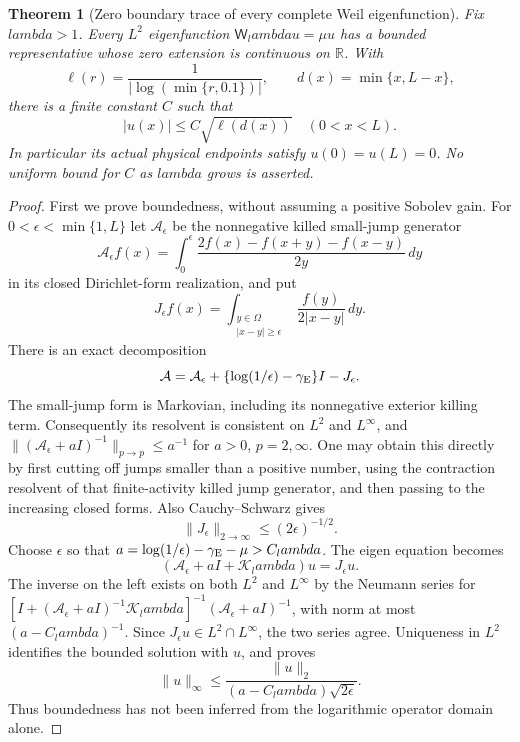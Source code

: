 \documentclass[11pt]{article}
\def\lambda{lambda}%
\newtheorem{theorem}{Theorem}[section]
\theoremstyle{remark}
\begin{document}
\begin{theorem}[Zero boundary trace of every complete Weil eigenfunction]
\label{thm:v118-eigen-endpoint-zero}
Fix $\lambda>1$.  Every $L^2$ eigenfunction
$\mathsf W_\lambda u=\mu u$ has a bounded representative whose zero
extension is continuous on $\mathbb R$.  With
\[
 \ell(r)=\frac1{|\log(\min\{r,0.1\})|},\qquad
 d(x)=\min\{x,L-x\},
\]
there is a finite constant $C$ such that
\begin{equation}\label{eq:v118-eigen-boundary-decay}
 |u(x)|\le C\sqrt{\ell(d(x))}\quad(0<x<L).
\end{equation}
In particular its actual physical endpoints satisfy $u(0)=u(L)=0$.
No uniform bound for $C$ as $\lambda$ grows is asserted.
\end{theorem}
\begin{proof}
First we prove boundedness, without assuming a positive Sobolev gain.
For $0<\epsilon<\min\{1,L\}$ let $\mathcal A_\epsilon$ be the
nonnegative killed small-jump generator
\[
 \mathcal A_\epsilon f(x)=\int_0^\epsilon
       \frac{2f(x)-f(x+y)-f(x-y)}{2y}\,dy
\]
in its closed Dirichlet-form realization, and put
\[
 J_\epsilon f(x)=\int_{\substack{y\in\Omega\\|x-y|\ge\epsilon}}
                    \frac{f(y)}{2|x-y|}\,dy.
\]
There is an exact decomposition
\[
 \mathcal A=\mathcal A_\epsilon+
       \{\log(1/\epsilon)-\gamma_{\rm E}\}I-J_\epsilon.
\]
The small-jump form is Markovian, including its nonnegative exterior
killing term.  Consequently its resolvent is consistent on $L^2$
and $L^\infty$, and
$\|(\mathcal A_\epsilon+aI)^{-1}\|_{p\to p}\le a^{-1}$ for
$a>0$, $p=2,\infty$.  One may obtain this directly by first cutting
off jumps smaller than a positive number, using the contraction
resolvent of that finite-activity killed jump generator, and then
passing to the increasing closed forms.  Also Cauchy--Schwarz gives
\[
 \|J_\epsilon\|_{2\to\infty}\le(2\epsilon)^{-1/2}.
\]
Choose $\epsilon$ so that
$a=\log(1/\epsilon)-\gamma_{\rm E}-\mu>C_\lambda$.
The eigen equation becomes
\[
 (\mathcal A_\epsilon+aI+\mathcal K_\lambda)u=J_\epsilon u.
\]
The inverse on the left exists on both $L^2$ and $L^\infty$ by the
Neumann series for
$[I+(\mathcal A_\epsilon+aI)^{-1}\mathcal K_\lambda]^{-1}
 (\mathcal A_\epsilon+aI)^{-1}$, with norm at most
$(a-C_\lambda)^{-1}$.  Since $J_\epsilon u\in L^2\cap L^\infty$,
the two series agree.  Uniqueness in $L^2$ identifies the bounded
solution with $u$, and proves
\[
 \|u\|_\infty\le
   \frac{\|u\|_2}{(a-C_\lambda)\sqrt{2\epsilon}}.
\]
Thus boundedness has not been inferred from the logarithmic operator
domain alone.


\end{proof}
\end{document}
